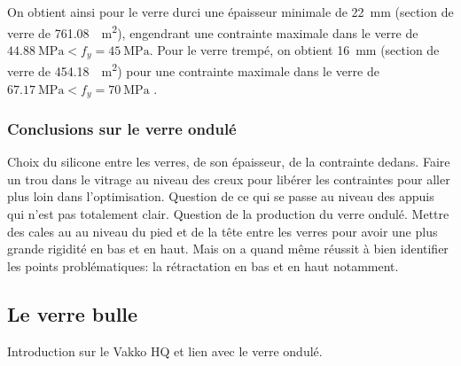 \documentclass[11pt,titlepage]{article}
\begin{document}
On obtient ainsi pour le verre durci une épaisseur minimale de \qty{22}{\milli\meter} (section de verre de \qty{761.08}{\centi\square\meter}), engendrant une contrainte maximale dans le verre de $\qty{44.88}{\mega\pascal} < f_y = \qty{45}{\mega\pascal}$. Pour le verre trempé, on obtient \qty{16}{\milli\meter} (section de verre de \qty{454.18}{\centi\square\meter}) pour une contrainte maximale dans le verre de $\qty{67.17}{\mega\pascal} < f_y = \qty{70}{\mega\pascal}$ .

\subsubsection{Conclusions sur le verre ondulé}

Choix du silicone entre les verres, de son épaisseur, de la contrainte dedans. Faire un trou dans le vitrage au niveau des creux pour libérer les contraintes pour aller plus loin dans l'optimisation. Question de ce qui se passe au niveau des appuis qui n'est pas totalement clair. Question de la production du verre ondulé. Mettre des cales au au niveau du pied et de la tête entre les verres pour avoir une plus grande rigidité en bas et en haut. Mais on a quand même réussit à bien identifier les points problématiques: la rétractation en bas et en haut notamment.

\subsection{Le verre bulle}

Introduction sur le Vakko HQ et lien avec le verre ondulé. 
\end{document}
